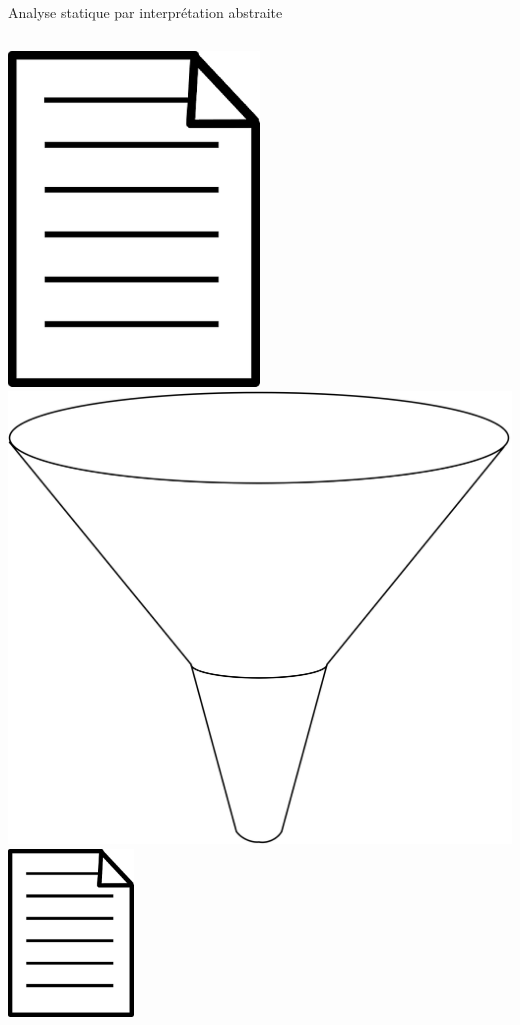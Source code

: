 \begin{frame}{Analyse statique par interprétation abstraite}
  \begin{columns}
    \begin{column}{0.3\textwidth}
      \begin{center}
        \includegraphics[width=0.5\textwidth]{media/fichier.png}
        \includegraphics[width=\textwidth]{media/entonnoir.png}
        \includegraphics[width=0.25\textwidth]{media/fichier.png}

\end{center}
\end{column}
\end{columns}
\end{frame}
